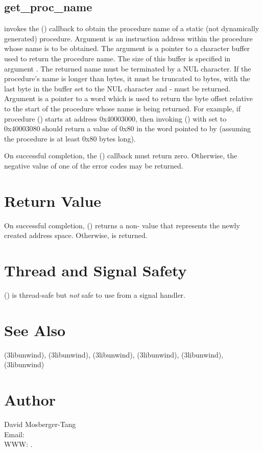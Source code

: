 \documentclass{article}
\begin{document}
\subsection{get\_proc\_name}

 invokes the () callback to
obtain the procedure name of a static (not dynamically generated)
procedure.  Argument  is an instruction address within the
procedure whose name is to be obtained.  The  argument is a
pointer to a character buffer used to return the procedure name.  The
size of this buffer is specified in argument .  The
returned name must be terminated by a NUL character.  If the
procedure's name is longer than  bytes, it must be
truncated to  bytes, with the last byte in the
buffer set to the NUL character and - must be
returned.  Argument  is a pointer to a word which is used to
return the byte offset relative to the start of the procedure whose
name is being returned.  For example, if procedure () starts
at address 0x40003000, then invoking () with
 set to 0x40003080 should return a value of 0x80 in the word
pointed to by  (assuming the procedure is at least 0x80
bytes long).

On successful completion, the () callback must
return zero.  Otherwise, the negative value of one of the
 error codes may be returned.


\section{Return Value}

On successful completion, () returns a
non- value that represents the newly created
address space.  Otherwise,  is returned.

\section{Thread and Signal Safety}

() is thread-safe but \emph{not}
safe to use from a signal handler.

\section{See Also}

(3libunwind),
(3libunwind),
(3libunwind),
(3libunwind),
(3libunwind),
(3libunwind)

\section{Author}

\noindent
David Mosberger-Tang\\
Email: \\
WWW: .
\LatexManEnd
\end{document}
